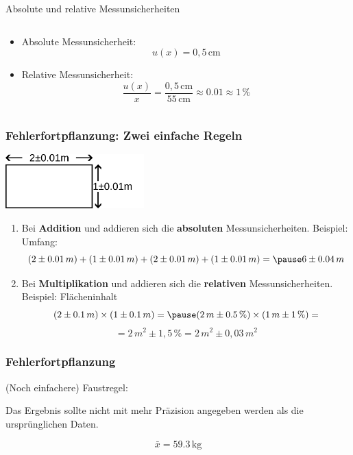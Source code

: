 \documentclass{beamer}
\begin{document}
\begin{frame}{Absolute und relative Messunsicherheiten}
\begin{columns}[c]
        \begin{column}{7cm}

\begin{itemize}
\item
Absolute Messunsicherheit: 
\[
u(x) = 0,5\,\text{cm}
\]

\item
Relative Messunsicherheit: 
\[
\frac{u(x)}{x} = \frac{0,5\,\text{cm}}{55\,\text{cm}} \approx 0.01 \approx 1\,\%  
\]



\end{itemize}
        
    \end{column}

\end{columns}

\end{frame}



\begin{frame}
\frametitle{Fehlerfortpflanzung: Zwei einfache Regeln}


\begin{center}
    \includegraphics[width=0.4\textwidth]{Rechteck.png}
\end{center}

\begin{enumerate}
    \item 
Bei \textbf{Addition} und  addieren sich die \textbf{absoluten} Messunsicherheiten. Beispiel: Umfang: 
\[
(2\pm 0.01\,m) + (1\pm 0.01\,m) + (2\pm 0.01\,m) + (1\pm 0.01\,m) = \pause 6 \pm 0.04\,m
\]


        \item 
Bei \textbf{Multiplikation} und  addieren sich die \textbf{relativen} Messunsicherheiten. Beispiel: Flächeninhalt 
\[
(2\pm 0.1\,m) \times (1 \pm 0.1\,m) = \pause (2\,m\pm 0.5\,\%)  \times (1\,m \pm 1\,\%) =
\]
\pause
\[
= 2\,m^2 \pm 1,5\,\% = 2\,m^2 \pm 0,03\,m^2
\]



\end{enumerate}


\end{frame}

\begin{frame}
\frametitle{Fehlerfortpflanzung}

(Noch einfachere) Faustregel:

Das Ergebnis sollte nicht mit mehr Präzision angegeben werden als die ursprünglichen Daten. 

\pause

\[
\bar{x} = 59.3\,\text{kg}
\]

\end{frame}
\end{document}
